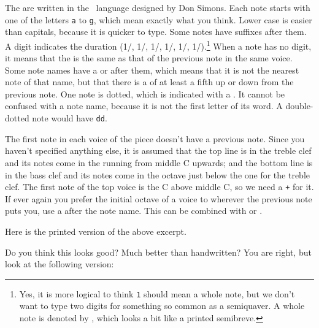 \documentclass[11pt]{article}
\begin{document}
The  are written in the \PMX\ language designed by Don Simons.  
Each note starts with one of the letters \texttt{a} to \texttt{g}, which mean 
exactly what you think.  Lower case is easier than capitals, because it is 
quicker to type.  Some notes have suffixes after them.  A digit indicates the 
duration (1/, 1/, 1/, 1/, 1/, 1/).\footnote{Yes, it is more 
logical to think \texttt{1} should mean a whole note, but we don't want to 
type two digits for something so common as a semiquaver.  A whole
note is denoted by , which looks a bit like a printed semibreve.}  
When a note has 
no digit, it means that the  is the same as that of the 
previous note in the same voice.  Some note names have a \ttxem{+} or 
\ttxem{-} after them, which means that it is not the nearest note of that 
name, but that there is a  of at least a fifth up or down from the 
previous note.  One note is dotted,  which is indicated 
with a .  It cannot be confused with a note name, because it is not 
the first letter of its word. A double-dotted note
would have \texttt{dd}. 

The first note in each voice of the piece doesn't have a previous note.  
Since you haven't specified anything else, it is assumed that the top 
line is in the treble clef and its notes come in the  running from 
middle C upwards; and the bottom line is in the bass clef and its notes 
come in the octave just below the one for the treble clef.  The first 
note of the top voice is the C above middle C, so we need a \texttt{+} 
for it.     If ever again you prefer the initial octave of a voice to wherever
the previous note puts you, use a \ttxem{=} after the note name. This
can be combined with \ttxem{+} or \ttxem{-}.

Here is the printed version of the above excerpt.

\vskip-5mm\hskip -18mm
\begin{mus}

\end{mus}

Do you think this looks good?  Much better than handwritten?  You are 
right, but look at the following version:

\begin{center}
\begin{mus}

\end{mus}
\end{center}
\end{document}

